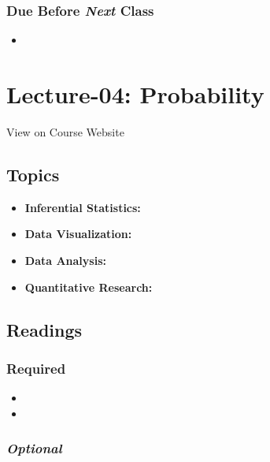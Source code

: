 \documentclass[]{book}
\providecommand{\tightlist}{%
  \setlength{\itemsep}{0pt}\setlength{\parskip}{0pt}}
\theoremstyle{definition}
\theoremstyle{definition}
\theoremstyle{definition}
\theoremstyle{remark}
\begin{document}
\subsubsection*{\texorpdfstring{Due Before \emph{Next}
Class}{Due Before Next Class}}\label{due-before-next-class-3}

\begin{itemize}
\item
\end{itemize}

\section{Lecture-04: Probability}\label{lecture-04-probability}

View on Course Website

\subsection*{Topics}\label{topics-4}

\begin{itemize}
\tightlist
\item
  \textbf{Inferential Statistics:}
\item
  \textbf{Data Visualization:}
\item
  \textbf{Data Analysis:}
\item
  \textbf{Quantitative Research:}
\end{itemize}

\subsection*{Readings}\label{readings-5}

\subsubsection*{Required}\label{required-4}

\begin{itemize}
\item
\item
\end{itemize}

\subsubsection*{\texorpdfstring{\emph{Optional}}{Optional}}\label{optional-4}
\end{document}

